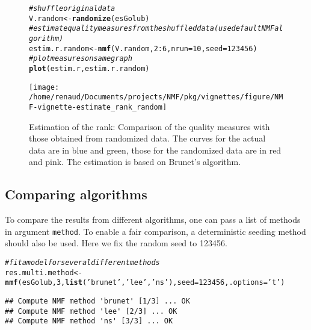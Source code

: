\documentclass[a4paper]{article}\usepackage[]{graphicx}\usepackage[]{color}
\makeatletter
\def\maxwidth{ %
  \ifdim\Gin@nat@width>\linewidth
    \linewidth
  \else
    \Gin@nat@width
  \fi
}
\newcommand{\hlnum}[1]{\textcolor[rgb]{0.686,0.059,0.569}{#1}}%
\newcommand{\hlstr}[1]{\textcolor[rgb]{0.192,0.494,0.8}{#1}}%
\newcommand{\hlcom}[1]{\textcolor[rgb]{0.678,0.584,0.686}{\textit{#1}}}%
\newcommand{\hlopt}[1]{\textcolor[rgb]{0,0,0}{#1}}%
\newcommand{\hlstd}[1]{\textcolor[rgb]{0.345,0.345,0.345}{#1}}%
\newcommand{\hlkwb}[1]{\textcolor[rgb]{0.69,0.353,0.396}{#1}}%
\newcommand{\hlkwc}[1]{\textcolor[rgb]{0.333,0.667,0.333}{#1}}%
\newcommand{\hlkwd}[1]{\textcolor[rgb]{0.737,0.353,0.396}{\textbf{#1}}}%
\newenvironment{kframe}{%
 \def\at@end@of@kframe{}%
 \ifinner\ifhmode%
  \def\at@end@of@kframe{\end{minipage}}%
  \begin{minipage}{\columnwidth}%
 \fi\fi%
 \def\FrameCommand##1{\hskip\@totalleftmargin \hskip-\fboxsep
 \colorbox{shadecolor}{##1}\hskip-\fboxsep
     \hskip-\linewidth \hskip-\@totalleftmargin \hskip\columnwidth}%
 \MakeFramed {\advance\hsize-\width
   \@totalleftmargin\z@ \linewidth\hsize
   \@setminipage}}%
 {\par\unskip\endMakeFramed%
 \at@end@of@kframe}
\newenvironment{knitrout}{}{} %
\let\code=\texttt
\makeatother
\begin{document}
\begin{figure}
\begin{knitrout}
\color{fgcolor}\begin{kframe}
\begin{alltt}
\hlcom{# shuffle original data}
\hlstd{V.random} \hlkwb{<-} \hlkwd{randomize}\hlstd{(esGolub)}
\hlcom{# estimate quality measures from the shuffled data (use default NMF algorithm)}
\hlstd{estim.r.random} \hlkwb{<-} \hlkwd{nmf}\hlstd{(V.random,} \hlnum{2}\hlopt{:}\hlnum{6}\hlstd{,} \hlkwc{nrun}\hlstd{=}\hlnum{10}\hlstd{,} \hlkwc{seed}\hlstd{=}\hlnum{123456}\hlstd{)}
\hlcom{# plot measures on same graph}
\hlkwd{plot}\hlstd{(estim.r, estim.r.random)}
\end{alltt}
\end{kframe}
\texttt{[image: /home/renaud/Documents/projects/NMF/pkg/vignettes/figure/NMF-vignette-estimate\_rank\_random]} 

\end{knitrout}
\caption{Estimation of the rank: Comparison of the quality measures with those obtained from randomized data. 
The curves for the actual data are in blue and green, those for the randomized data are in red and pink. 
The estimation is based on Brunet's algorithm.}
\label{fig:estim_all_rd}
\end{figure}

\subsection{Comparing algorithms}
To compare the results from different algorithms, one can pass a list of methods in argument \code{method}. 
To enable a fair comparison, a deterministic seeding method should also be used. 
Here we fix the random seed to 123456. 

\begin{knitrout}
\color{fgcolor}\begin{kframe}
\begin{alltt}
\hlcom{# fit a model for several different methods }
\hlstd{res.multi.method} \hlkwb{<-} \hlkwd{nmf}\hlstd{(esGolub,} \hlnum{3}\hlstd{,} \hlkwd{list}\hlstd{(}\hlstr{'brunet'}\hlstd{,} \hlstr{'lee'}\hlstd{,} \hlstr{'ns'}\hlstd{),} \hlkwc{seed}\hlstd{=}\hlnum{123456}\hlstd{,} \hlkwc{.options}\hlstd{=}\hlstr{'t'}\hlstd{)}
\end{alltt}
\begin{verbatim}
## Compute NMF method 'brunet' [1/3] ... OK
## Compute NMF method 'lee' [2/3] ... OK
## Compute NMF method 'ns' [3/3] ... OK
\end{verbatim}
\end{kframe}
\end{knitrout}
\end{document}
